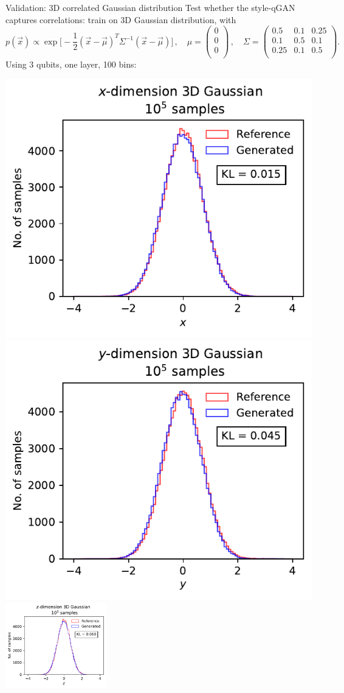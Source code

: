 \documentclass[11pt,aspectratio=169]{beamer}
\begin{document}
\begin{frame}{Validation: 3D correlated Gaussian distribution}
    Test whether the style-qGAN captures correlations: train on 3D Gaussian distribution, with
    \begin{equation*}
        p(\vec{x}) \propto \exp \Big[ - \frac{1}{2} (\vec{x} - \vec{\mu})^T
        \Sigma^{-1} (\vec{x} - \vec{\mu}) \Big] \,, \quad
        \mu =
\begin{pmatrix}
  0 \\
  0 \\
  0 \\
  \end{pmatrix}\,, \quad
        \Sigma =
\begin{pmatrix}
  0.5 & 0.1 & 0.25\\
  0.1 & 0.5 & 0.1\\
  0.25 & 0.1 & 0.5\\
  \end{pmatrix}.
    \end{equation*}
    Using 3 qubits, one layer, 100 bins:
    \begin{multicols*}{3}
        \includegraphics[width=0.33 \textwidth]{figures/plots/3Dgaussian_posdef/1-distribution_3dgaussian_100k.pdf}
        \includegraphics[width=0.33 \textwidth]{figures/plots/3Dgaussian_posdef/2-distribution_3dgaussian_100k.pdf}
        \includegraphics[width=0.33\textwidth]{figures/plots/3Dgaussian_posdef/3-distribution_3dgaussian_100k.pdf}
    \end{multicols*}
\end{frame}
\end{document}
